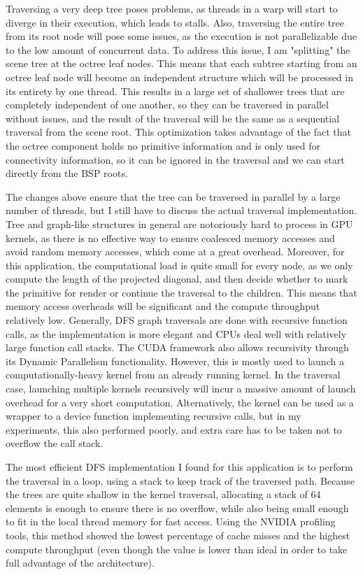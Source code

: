 Traversing a very deep tree poses problems, as threads in a warp will start to diverge in their execution, which leads to stalls. Also, traversing the entire tree from its root node will pose some issues, as the execution is not parallelizable due to the low amount of concurrent data. To address this issue, I am "splitting" the scene tree at the octree leaf nodes. This means that each subtree starting from an octree leaf node will become an independent structure which will be processed in its entirety by one thread. This results in a large set of shallower trees that are completely independent of one another, so they can be traversed in parallel without issues, and the result of the traversal will be the same as a sequential traversal from the scene root. This optimization takes advantage of the fact that the octree component holds no primitive information and is only used for connectivity information, so it can be ignored in the traversal and we can start directly from the BSP roots.

The changes above ensure that the tree can be traversed in parallel by a large number of threads, but I still have to discuss the actual traversal implementation. Tree and graph-like structures in general are notoriously hard to process in GPU kernels, as there is no effective way to ensure coalesced memory accesses and avoid random memory accesses, which come at a great overhead. Moreover, for this application, the computational load is quite small for every node, as we only compute the length of the projected diagonal, and then decide whether to mark the primitive for render or continue the traversal to the children. This means that memory access overheads will be significant and the compute throughput relatively low. Generally, DFS graph traversals are done with recursive function calls, as the implementation is more elegant and CPUs deal well with relatively large function call stacks. The CUDA framework also allows recursivity through its Dynamic Parallelism functionality. However, this is mostly used to launch a computationally-heavy kernel from an already running kernel. In the traversal case, launching multiple kernels recursively will incur a massive amount of launch overhead for a very short computation. Alternatively, the kernel can be used as a wrapper to a device function implementing recursive calls, but in my experiments, this also performed poorly, and extra care has to be taken not to overflow the call stack.

The most efficient DFS implementation I found for this application is to perform the traversal in a loop, using a stack to keep track of the traversed path. Because the trees are quite shallow in the kernel traversal, allocating a stack of 64 elements is enough to ensure there is no overflow, while also being small enough to fit in the local thread memory for fast access. Using the NVIDIA profiling tools, this method showed the lowest percentage of cache misses and the highest compute throughput (even though the value is lower than ideal in order to take full advantage of the architecture).

